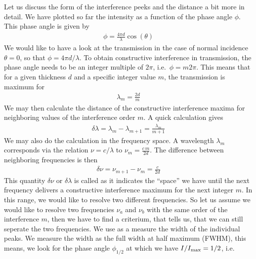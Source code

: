 \documentclass[letterpaper,10pt,english]{sphinxmanual}
\begin{document}
Let us discuss the form of the interference peeks and the distance a bit more in detail. We have plotted so far the intensity as a function of the phase angle \(\phi\). This phase angle is given by
\begin{equation*}
\begin{split}\phi=\frac{4\pi d}{\lambda}\cos(\theta)\end{split}
\end{equation*}
We would like to have a look at the transmission in the case of normal incidence \(\theta=0\), so that \(\phi=4\pi d/\lambda\). To obtain constructive interference in transmission, the phase angle needs to be an integer multiple of \(2\pi\), i.e. \(\phi=m 2\pi\). This means that for a given thickness \(d\) and a specific integer value \(m\), the transmission is maximum for
\begin{equation*}
\begin{split}\lambda_m=\frac{2d}{m}\end{split}
\end{equation*}
We may then calculate the distance of the constructive interference maxima for neighboring values of the interference order \(m\). A quick calculation gives
\begin{equation*}
\begin{split}\delta \lambda= \lambda_{m}-\lambda_{m+1}=\frac{\lambda_m}{m+1}\end{split}
\end{equation*}
We may also do the calculation in the frequency space. A wavelength \(\lambda_m\) corresponds via the relation \(\nu=c/\lambda\) to \(\nu_m=\frac{c\, m}{2d}\). The difference between neighboring frequencies is then
\begin{equation*}
\begin{split}\delta \nu=\nu_{m+1}-\nu_m=\frac{c}{2d}\end{split}
\end{equation*}
This quantity \(\delta \nu\) or \(\delta \lambda\) is called  as it indicates the “space” we have until the next frequency delivers a constructive interference maximum for the next integer \(m\). In this range, we would like to resolve two different frequencies. So let us assume we would like to resolve two frequencies \(\nu_a\) and \(\nu_b\) with the same order of the interference \(m\), then we have to find a criterium, that tells us, that we can
still seperate the two frequencies. We use as a measure the width of the individual peaks. We measure the width as the full width at half maximum (FWHM), this means, we look for the phase angle \(\phi_{1/2}\) at which we have \(I/I_{\rm max}=1/2\), i.e.
\end{document}
